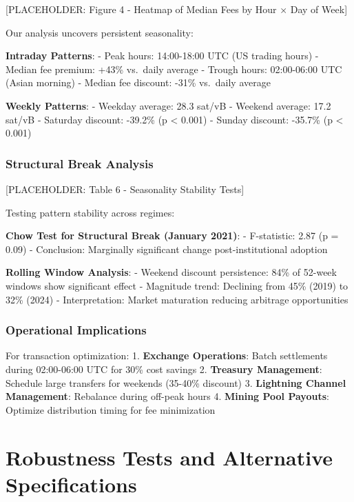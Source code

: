 \documentclass[
  12pt,
  letterpaper,
  DIV=11,
  numbers=noendperiod]{scrartcl}
\begin{document}
{[}PLACEHOLDER: Figure 4 - Heatmap of Median Fees by Hour × Day of
Week{]}

Our analysis uncovers persistent seasonality:

\textbf{Intraday Patterns}: - Peak hours: 14:00-18:00 UTC (US trading
hours) - Median fee premium: +43\% vs.~daily average - Trough hours:
02:00-06:00 UTC (Asian morning) - Median fee discount: -31\% vs.~daily
average

\textbf{Weekly Patterns}: - Weekday average: 28.3 sat/vB - Weekend
average: 17.2 sat/vB - Saturday discount: -39.2\% (p \textless{} 0.001)
- Sunday discount: -35.7\% (p \textless{} 0.001)

\subsubsection{Structural Break
Analysis}\label{structural-break-analysis}

{[}PLACEHOLDER: Table 6 - Seasonality Stability Tests{]}

Testing pattern stability across regimes:

\textbf{Chow Test for Structural Break (January 2021)}: - F-statistic:
2.87 (p = 0.09) - Conclusion: Marginally significant change
post-institutional adoption

\textbf{Rolling Window Analysis}: - Weekend discount persistence: 84\%
of 52-week windows show significant effect - Magnitude trend: Declining
from 45\% (2019) to 32\% (2024) - Interpretation: Market maturation
reducing arbitrage opportunities

\subsubsection{Operational Implications}\label{operational-implications}

For transaction optimization: 1. \textbf{Exchange Operations}: Batch
settlements during 02:00-06:00 UTC for 30\% cost savings 2.
\textbf{Treasury Management}: Schedule large transfers for weekends
(35-40\% discount) 3. \textbf{Lightning Channel Management}: Rebalance
during off-peak hours 4. \textbf{Mining Pool Payouts}: Optimize
distribution timing for fee minimization

\section{Robustness Tests and Alternative
Specifications}\label{robustness-tests-and-alternative-specifications}
\end{document}
